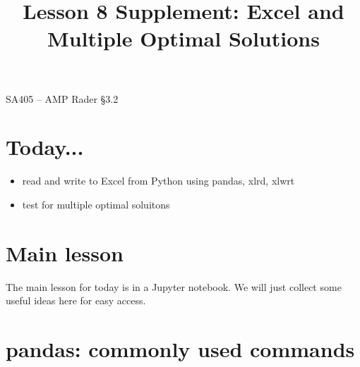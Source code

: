 \documentclass[11pt]{article}
\makeatletter
\theoremstyle{definition}
\renewcommand{\maketitle}{
  \noindent SA405 -- AMP \hfill Rader \S 3.2 \\

  \begin{center}\Large{\textbf{\@title}}\end{center}
}
\makeatother
\begin{document}
  
\title{Lesson 8  Supplement:  Excel and Multiple Optimal Solutions}

\maketitle

\section{Today...}

\begin{itemize}
	\item  read and write to Excel from Python using pandas, xlrd, xlwrt
	\item  test for multiple optimal soluitons
\end{itemize}

\section{Main lesson}
The main lesson for today is in a Jupyter notebook.  We will just collect some useful ideas here for easy access.

\section{pandas: commonly used commands}
\end{document}

